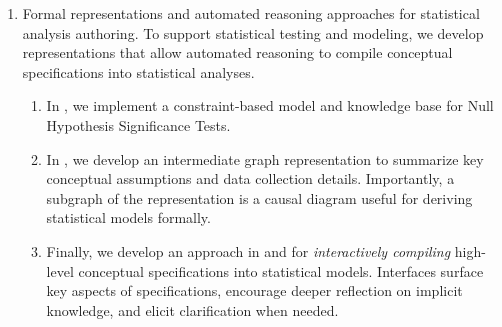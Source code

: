 \begin{enumerate}
    \item Formal representations and automated reasoning approaches for
    statistical analysis authoring. To support statistical testing and modeling,
    we develop representations that allow automated reasoning to compile
    conceptual specifications into statistical analyses. 
    \begin{enumerate}
        \item In \tea, we implement a constraint-based model and knowledge base
        for Null Hypothesis Significance Tests. 
        \item In \tisane, we develop an intermediate graph representation to
        summarize key conceptual assumptions and data collection details.
        Importantly, a subgraph of the representation is a causal diagram useful
        for deriving statistical models formally. 
        \item Finally, we develop an approach in \tisane and \rTisane for \textit{interactively
        compiling} high-level conceptual specifications into statistical models.
        Interfaces surface key aspects of specifications, encourage deeper reflection
        on implicit knowledge, and elicit
        clarification when needed. 
    \end{enumerate}
\end{enumerate}

